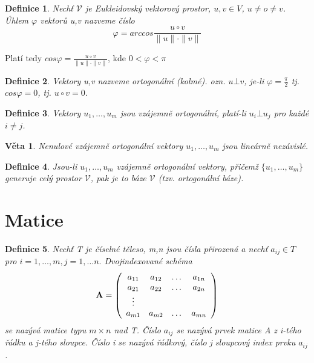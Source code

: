 \documentclass[12pt,a4paper]{article}
\newtheorem{definition}{Definice}
\newtheorem{sentence}{Věta}
\begin{document}
\begin{definition}
	Nechť $\mathscr{V}$ je Eukleidovský vektorový prostor, $u,v \in V$, $u \not= o \not= v$. Úhlem $\varphi$ vektorů u,v nazveme číslo $$\varphi = arccos \frac{u \circ v}{\| u \| \cdot \| v \|}$$
\end{definition}
Platí tedy $cos \varphi = \frac{u \circ v}{\| u \| \cdot \| v \|}$, kde $0 < \varphi < \pi$

\begin{definition}
	Vektory u,v nazveme ortogonální (kolmé). ozn. $u \bot v$, je-li $\varphi = \frac{\pi}{2}$ tj. $cos \varphi = 0$, tj. $u \circ v = 0$.
\end{definition}

\begin{definition}
	Vektory $u_1, \dots, u_m$ jsou vzájemně ortogonální, platí-li $u_i \bot u_j$ pro každé $i \not= j$.
\end{definition}

\begin{sentence}
	Nenulové vzájemně ortogonální vektory $u_1, \dots, u_m$ jsou lineárně nezávislé.
\end{sentence}

\begin{definition}
	Jsou-li  $u_1, \dots, u_m$ vzájemně ortogonální vektory, přičemž $\{ u_1, \dots, u_m\}$ generuje celý prostor $\mathscr{V}$, pak je to báze $\mathscr{V}$ (tzv. ortogonální báze).
\end{definition}

\section{Matice}
\begin{definition}
	Nechť T je číselné těleso, m,n jsou čísla přirozená a nechť $a_{ij} \in T$  pro $i = 1, \dots, m, j = 1, \dots n.$ Dvojindexované schéma
\begin{displaymath}
{\bf A} =
\left( \begin{array}{cccc}
a_{11} & a_{12} & \dots & a_{1n} \\
a_{21} & a_{22} & \dots & a_{2n} \\
\vdots &  &  &  \\
a_{m1} & a_{m2} & \dots & a_{mn} \\
\end{array} \right)
\end{displaymath}
se nazývá matice typu $m \times n$ nad T. Číslo $a_{ij}$ se nazývá prvek matice A z i-tého řádku a j-tého sloupce. Číslo i se nazývá řádkový, číslo j sloupcový index prvku $a_{ij}$.
\end{definition}
\end{document}
